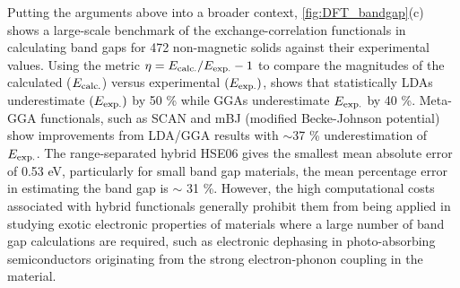 Putting the arguments above into a broader context, \cref{fig:DFT_bandgap}(c) shows a large-scale benchmark of the exchange-correlation functionals in calculating band gaps for 472 non-magnetic solids against their experimental values. Using the metric $\eta=E_{\mbox{\scriptsize{calc.}}}/E_{\mbox{\scriptsize{exp.}}}-1$ to compare the magnitudes of the calculated ($E_{\mbox{\scriptsize{calc.}}}$) versus experimental $(E_{\mbox{\scriptsize{exp.}}})$, \citet{borlido2019large} shows that statistically LDAs underestimate $(E_{\mbox{\scriptsize{exp.}}})$ by 50 \% while GGAs underestimate $E_{\mbox{\scriptsize{exp.}}}$ by 40 \%. Meta-GGA functionals, such as SCAN\cite{sun2013semilocal} and mBJ (modified Becke-Johnson potential)\cite{becke2006simple,tran2009accurate} show improvements from LDA/GGA results with $\sim$37 \% underestimation of  $E_{\mbox{\scriptsize{exp.}}}$. The range-separated hybrid HSE06\cite{krukau2006influence} gives the smallest mean absolute error of 0.53 eV, particularly for small band gap materials, the mean percentage error in estimating the band gap is $\sim$ 31 \%. However, the high computational costs associated with hybrid functionals generally prohibit them from being applied in studying exotic electronic properties of materials where a large number of band gap calculations are required, such as electronic dephasing in photo-absorbing semiconductors originating from the strong electron-phonon coupling in the material.\cite{li2018time,li2019anharmonicity,yang2020correlating} 

